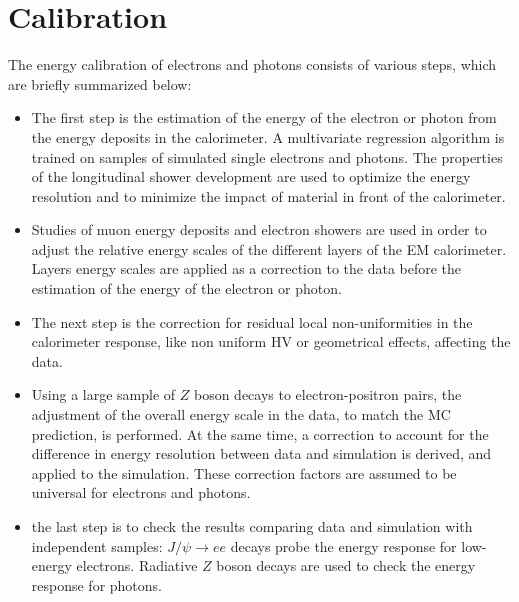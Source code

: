 \documentclass[a4paper, oneside, 11pt, openright]{book}
\begin{document}
		\section{Calibration}\label{section:Calib}
			The energy calibration of electrons and photons \cite{calibration} consists of various steps, which are briefly summarized below:
			\begin{itemize}
				\item The first step is the estimation of the energy of the electron or photon from the energy deposits in the calorimeter. A multivariate regression algorithm is trained on samples of simulated single electrons and photons. The properties of the longitudinal shower development are used to optimize the energy resolution and to minimize the impact of material in front of the calorimeter.
				\item Studies of muon energy deposits and electron showers are used in order to adjust the relative energy scales of the different layers of the EM calorimeter. Layers energy scales are applied as a correction to the data before the estimation of the energy of the electron or photon.
				\item The next step is the correction for residual local non-uniformities in the calorimeter response, like non uniform HV or geometrical effects, affecting the data.
				\item Using a large sample of $Z$ boson decays to electron-positron pairs, the adjustment of the overall energy scale in the data, to match the MC prediction, is performed. At the same time, a correction to account for the difference in energy resolution between data and simulation is derived, and applied to the simulation. These correction factors are assumed to be universal for electrons and photons.
				\item the last step is to check the results comparing data and simulation with independent samples: $J/\psi \rightarrow ee$ decays probe the energy response for low-energy electrons. Radiative $Z$ boson decays are used to check the energy response for photons.
			\end{itemize}
		
\end{document}
